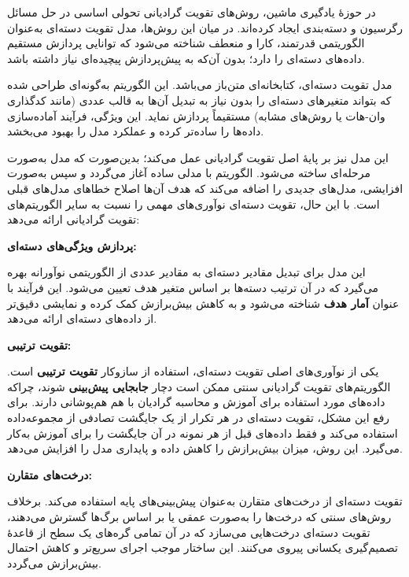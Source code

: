 در حوزهٔ یادگیری ماشین، روش‌های تقویت گرادیانی تحولی اساسی در حل مسائل رگرسیون و دسته‌بندی ایجاد کرده‌اند. در میان این روش‌ها، مدل تقویت دسته‌ای به‌عنوان الگوریتمی قدرتمند، کارا و منعطف شناخته می‌شود که توانایی پردازش مستقیم داده‌های دسته‌ای را دارد؛ بدون آن‌که به پیش‌پردازش پیچیده‌ای نیاز داشته باشد.

مدل تقویت دسته‌ای، کتابخانه‌ای متن‌باز می‌باشد. این الگوریتم به‌گونه‌ای طراحی شده که بتواند متغیرهای دسته‌ای را بدون نیاز به تبدیل آن‌ها به قالب عددی (مانند کدگذاری وان-هات یا روش‌های مشابه) مستقیماً پردازش نماید. این ویژگی، فرآیند آماده‌سازی داده‌ها را ساده‌تر کرده و عملکرد مدل را بهبود می‌بخشد.

این مدل نیز بر پایهٔ اصل تقویت گرادیانی عمل می‌کند؛ بدین‌صورت که مدل به‌صورت مرحله‌ای ساخته می‌شود. الگوریتم با مدلی ساده آغاز می‌گردد و سپس به‌صورت افزایشی، مدل‌های جدیدی را اضافه می‌کند که هدف آن‌ها اصلاح خطاهای مدل‌های قبلی است. با این حال، تقویت دسته‌ای نوآوری‌های مهمی را نسبت به سایر الگوریتم‌های تقویت گرادیانی ارائه می‌دهد:

\vspace{0.3cm}
\textbf{پردازش ویژگی‌های دسته‌ای:}

این مدل برای تبدیل مقادیر دسته‌ای به مقادیر عددی از الگوریتمی نوآورانه بهره می‌گیرد که در آن ترتیب دسته‌ها بر اساس متغیر هدف تعیین می‌شود. این فرآیند با عنوان \textbf{آمار هدف} شناخته می‌شود و به کاهش بیش‌برازش کمک کرده و نمایشی دقیق‌تر از داده‌های دسته‌ای ارائه می‌دهد.

\vspace{0.3cm}
\textbf{تقویت ترتیبی:}

یکی از نوآوری‌های اصلی تقویت دسته‌ای، استفاده از سازوکار \textbf{تقویت ترتیبی} است. الگوریتم‌های تقویت گرادیانی سنتی ممکن است دچار \textbf{جابجایی پیش‌بینی} شوند، چراکه داده‌های مورد استفاده برای آموزش و محاسبه گرادیان با هم هم‌پوشانی دارند. برای رفع این مشکل، تقویت دسته‌ای در هر تکرار از یک جایگشت تصادفی از مجموعه‌داده استفاده می‌کند و فقط داده‌های قبل از هر نمونه در آن جایگشت را برای آموزش به‌کار می‌گیرد. این روش، میزان بیش‌برازش را کاهش داده و پایداری مدل را افزایش می‌دهد.

\vspace{0.3cm}
\textbf{درخت‌های متقارن:}

تقویت دسته‌ای از درخت‌های متقارن به‌عنوان پیش‌بینی‌های پایه استفاده می‌کند. برخلاف روش‌های سنتی که درخت‌ها را به‌صورت عمقی یا بر اساس برگ‌ها گسترش می‌دهند، تقویت دسته‌ای درخت‌هایی می‌سازد که در آن تمامی گره‌های یک سطح از قاعدهٔ تصمیم‌گیری یکسانی پیروی می‌کنند. این ساختار موجب اجرای سریع‌تر و کاهش احتمال بیش‌برازش می‌گردد.

